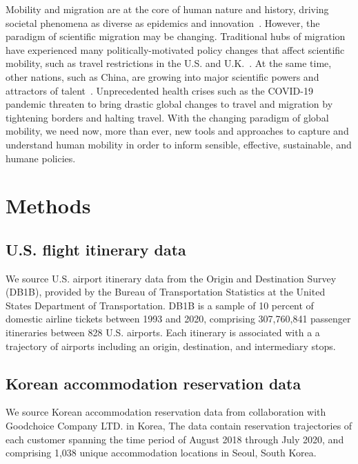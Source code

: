 \documentclass[12pt]{article} %
\begin{document}
Mobility and migration are at the core of human nature and history, driving societal phenomena as diverse as epidemics\autocite{kraemer2020covid, truscott2012epidemicgravity} and innovation~\autocite{kaiser2018innovation, sugimoto2017mostimpact, petersen2018multiscale, morgan2018prestige, rodrigues2016mobility}.
However, the paradigm of scientific migration may be changing.
Traditional hubs of migration have experienced many politically-motivated policy changes that affect scientific mobility, such as travel restrictions in the U.S. and U.K.~\autocite{chinchilla2018travelban}.
At the same time, other nations, such as China, are growing into major scientific powers and attractors of talent~\autocite{cao2020returning}.
Unprecedented health crises such as the COVID-19 pandemic threaten to bring drastic global changes to travel and migration by tightening borders and halting travel.
With the changing paradigm of global mobility, we need now, more than ever, new tools and approaches to capture and understand human mobility in order to inform sensible, effective, sustainable, and humane policies.


%
%
\section*{Methods}
\label{sec:datamethods} %

\subsection*{U.S. flight itinerary data}
We source U.S. airport itinerary data from the Origin and Destination Survey (DB1B), provided by the Bureau of Transportation Statistics at the United States Department of Transportation. 
DB1B is a sample of 10 percent of domestic airline tickets between 1993 and 2020, comprising 307,760,841 passenger itineraries between 828 U.S. airports. 
Each itinerary is associated with a a trajectory of airports including an origin, destination, and intermediary stops. 

\subsection*{Korean accommodation reservation data}
We source Korean accommodation reservation data from collaboration with Goodchoice Company LTD. in Korea, The data contain reservation trajectories of each customer spanning the time period of August 2018 through July 2020, and comprising 1,038 unique accommodation locations in Seoul, South Korea. 
\end{document}

